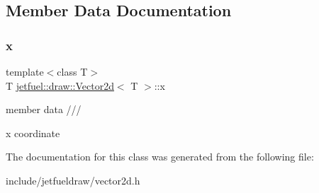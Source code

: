 \subsection{Member Data Documentation}
\mbox{\label{classjetfuel_1_1draw_1_1Vector2d_a1d0f2b544d0e746ca64b9c431fd4c8f1}} 
\subsubsection{\texorpdfstring{x}{x}}
{\footnotesize\ttfamily template$<$class T$>$ \\
T \hyperlink{classjetfuel_1_1draw_1_1Vector2d}{jetfuel\+::draw\+::\+Vector2d}$<$ T $>$\+::x}



member data /// 

x coordinate 

The documentation for this class was generated from the following file\+:\begin{DoxyCompactItemize}
\item 
include/jetfueldraw/vector2d.\+h\end{DoxyCompactItemize}
